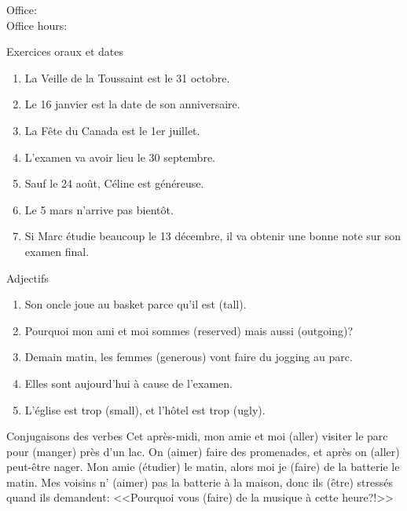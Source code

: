 \documentclass{beamer}
\subtitle[Révision: Examen 1]{La révision pour l'examen 1}
\begin{document}
  \begin{frame}
    \titlepage
    \tiny{Office: \\
          Office hours: }
  \end{frame}

  \begin{frame}{Exercices oraux et dates}
    \begin{enumerate}
      \item<2-> La Veille de la Toussaint est le 31 octobre.
      \item<3-> Le 16 janvier est la date de son anniversaire.
      \item<4-> La Fête du Canada est le 1er juillet.
      \item<5-> L'examen va avoir lieu le 30 septembre.
      \item<6-> Sauf le 24 août, Céline est généreuse.
      \item<7-> Le 5 mars n'arrive pas bientôt.
      \item<8-> Si Marc étudie beaucoup le 13 décembre, il va obtenir une bonne note sur son examen final.
    \end{enumerate}
  \end{frame}

  \begin{frame}{Adjectifs}
    \begin{enumerate}
      \item Son oncle joue au basket parce qu'il est \underline{} (tall).
      \item Pourquoi mon ami et moi sommes \underline{} (reserved) mais aussi \underline{} (outgoing)?
      \item Demain matin, les femmes \underline{} (generous) vont faire du jogging au parc.
      \item Elles sont \underline{} aujourd'hui à cause de l'examen.
      \item L'église est trop \underline{} (small), et l'hôtel est trop \underline{} (ugly).
    \end{enumerate}
  \end{frame}

  \begin{frame}{Conjugaisons des verbes}
    Cet après-midi, mon amie et moi \underline{} (aller) visiter le parc pour \underline{} (manger) près d'un lac.
    On \underline{} (aimer) faire des promenades, et après on \underline{} (aller) peut-être nager.
    Mon amie \underline{} (étudier) le matin, alors moi je \underline{} (faire) de la batterie le matin.
    Mes voisins n'\underline{} (aimer) pas la batterie à la maison, donc ils \underline{} (être) stressés quand ils demandent: <<Pourquoi vous \underline{} (faire) de la musique à cette heure?!>>
  \end{frame}
\end{document}
